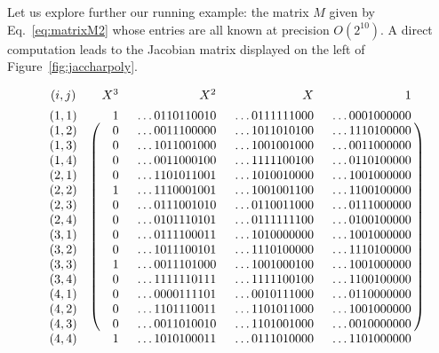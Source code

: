 \documentclass[11pt]{article}
\numberwithin{equation}{section}
\numberwithin{figure}{section}
\theoremstyle{definition}
\begin{document}
Let us explore further our running example: the matrix $M$ given by 
Eq.~\eqref{eq:matrixM2} whose entries are all known at precision 
$O(2^{10})$. A direct computation leads to the Jacobian matrix 
displayed on the left of Figure~\ref{fig:jaccharpoly}.
%
\begin{figure}
{\scriptsize\hfill
$\begin{array}{cc@{}r@{\hspace{1.5em}}r@{\hspace{1.5em}}r@{\hspace{1.5em}}r@{\hspace{0.2ex}}c}
(i,j) && X^3 & X^2 & X & 1 \\
\rule[3ex]{0pt}{\baselineskip}
(1,1) &
\raisebox{0.2ex}{\multirow{16}{*}{$\left(\parbox[c][39ex]{0cm}{}\right.$}}
 &1 & \ldots0110110010 & \ldots0111111000 & \ldots0001000000 &
\raisebox{0.2ex}{\multirow{16}{*}{$\left.\parbox[c][39ex]{0cm}{}\right)$}} \\
(1,2) &&0 & \ldots0011100000 & \ldots1011010100 & \ldots1110100000 \\
(1,3) &&0 & \ldots1011001000 & \ldots1001001000 & \ldots0011000000 \\
(1,4) &&0 & \ldots0011000100 & \ldots1111100100 & \ldots0110100000 \\
(2,1) &&0 & \ldots1101011001 & \ldots1010010000 & \ldots1001000000 \\
(2,2) &&1 & \ldots1110001001 & \ldots1001001100 & \ldots1100100000 \\
(2,3) &&0 & \ldots0111001010 & \ldots0110011000 & \ldots0111000000 \\
(2,4) &&0 & \ldots0101110101 & \ldots0111111100 & \ldots0100100000 \\
(3,1) &&0 & \ldots0111100011 & \ldots1010000000 & \ldots1001000000 \\
(3,2) &&0 & \ldots1011100101 & \ldots1110100000 & \ldots1110100000 \\
(3,3) &&1 & \ldots0011101000 & \ldots1001000100 & \ldots1001000000 \\
(3,4) &&0 & \ldots1111110111 & \ldots1111100100 & \ldots1100100000 \\
(4,1) &&0 & \ldots0000111101 & \ldots0010111000 & \ldots0110000000 \\
(4,2) &&0 & \ldots1101110011 & \ldots1101011000 & \ldots1001000000 \\
(4,3) &&0 & \ldots0011010010 & \ldots1101001000 & \ldots0010000000 \\
(4,4) &&1 & \ldots1010100011 & \ldots0111010000 & \ldots1101000000
\end{array}$
}
\end{figure}
\end{document}
